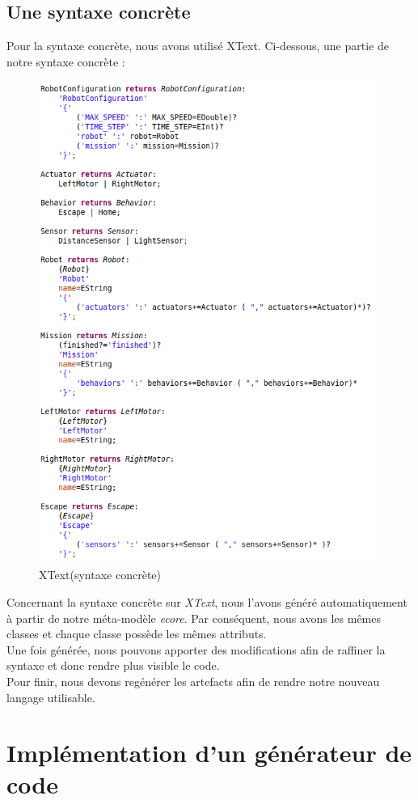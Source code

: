 \documentclass[a4paper,12pt]{article}
\begin{document}
\subsection{Une syntaxe concrète}
Pour la syntaxe concrète, nous avons utilisé XText. Ci-dessous, une partie de notre syntaxe concrète :
\begin{figure}[!h]  
    \includegraphics[width=11cm]{concrete.png}
    \caption{XText(syntaxe concrète)}
\end{figure}
\vspace{0.5cm}

Concernant la syntaxe concrète sur \textit{XText}, nous l'avons généré automatiquement à partir de notre méta-modèle \textit{ecore}. Par conséquent, nous avons les mêmes classes et chaque classe possède les mêmes attributs.
\\Une fois générée, nous pouvons apporter des modifications afin de raffiner la syntaxe et donc rendre plus visible le code.
\\Pour finir, nous devons regénérer les artefacts afin de rendre notre nouveau langage utilisable.


\newpage
\section{Implémentation d'un générateur de code}
\end{document}
